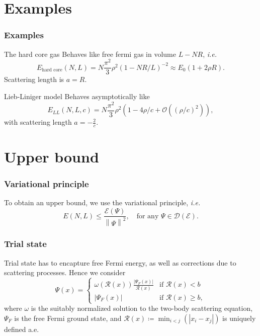 \documentclass{beamer}[10]
\newcommand{\norm}[1]{\left\lVert #1 \right\rVert}
\newcommand{\abs}[1]{\left\lvert #1 \right\rvert}
\newcommand{\ie}{\emph{i.e.} }
\newcommand{\rr}{\mathcal{R}}
\begin{document}
\section{Examples}
\begin{frame}
	\frametitle{Examples}
	\begin{block}{The hard core gas}
		Behaves like free fermi gas in volume $ L-NR $, \ie \begin{equation}
		E_{\text{hard core}}(N,L)=N\frac{\pi^2}{3}\rho^2 (1-NR/L)^{-2}\approx E_0(1+2\rho R).
		\end{equation}
		Scattering length is $ a=R $.
	\end{block}
	\begin{block}{Lieb-Liniger model}
		Behaves asymptotically like
		\begin{equation}
		E_{LL}(N,L,c)=N\frac{\pi^2}{3}\rho^2\left(1-4\rho/c+\mathcal{O}\left((\rho/c)^2\right)\right),
		\end{equation}
		with scattering length $ a=-\frac{2}{c} $.
	\end{block}
\end{frame}

\section{Upper bound}

\begin{frame}
	\frametitle{Variational principle}
	\begin{block}{}
		To obtain an upper bound, we use the variational principle, \ie
		$$
		E(N,L)\leq \frac{\mathcal{E}(\Psi)}{\norm{\Psi}^2},\quad \text{for any }  \Psi\in \mathcal{D}(\mathcal{E}) .
		$$
	\end{block}	
\end{frame}

\begin{frame}
	\frametitle{Trial state}
	\begin{block}{}
		Trial state has to encapture free Fermi energy, as well as corrections due to scattering processes. Hence we consider $$
		\Psi(x)=\begin{cases}
		\omega(\rr(x))\frac{\abs{\Psi_F(x)}}{\rr(x)}& \text{if }\rr(x)<b\\
		\abs{\Psi_F(x)}&\text{if }\rr(x)\geq b,
		\end{cases}
		$$
		where $ \omega $ is the suitably normalized solution to the two-body scattering equation,  $\Psi_F$ is the free Fermi ground state, and $ \rr(x)\coloneqq \min_{i<j}(\abs{x_i-x_j}) $ is uniquely defined a.e.
	\end{block}	
\end{frame}
\end{document}
